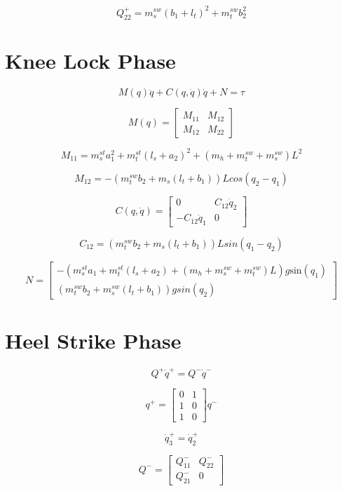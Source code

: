 \[
Q_{22}^{+}=m_{s}^{sw}(b_{1}+l_{t})^{2}+m_{t}^{sw}b_{2}^{2}\]



\section{Knee Lock Phase}


\[
M(q)\ddot{q}+C(q,\dot{q})\dot{q}+N=\tau\]


\[M(q)=\left[\begin{array}{cc}
M_{11} & M_{12}\\
M_{12} & M_{22}\end{array}\right]
\]

\[
M_{11}=m_{s}^{st}a_{1}^{2}+m_{t}^{st}(l_{s}+a_{2})^{2}+(m_{h}+m_{t}^{sw}+m_{s}^{sw})L^{2}\]


\[
M_{12}=-(m_{t}^{sw}b_{2}+m_{s}(l_{t}+b_{1}))Lcos(q_{2}-q_{1})\]


\[
C(q,\dot{q})=\left[\begin{array}{cc}
0 & C_{12}\dot{q}_{2}\\
-C_{12}\dot{q}_{1} & 0\end{array}\right]
\]

\[
C_{12}=(m_{t}^{sw}b_{2}+m_{s}(l_{t}+b_{1}))Lsin(q_{1}-q_{2})
\]

\[
N=\left[\begin{array}{c}
-(m_{s}^{st}a_{1}+m_{t}^{st}(l_{s}+a_{2})+(m_{h}+m_{s}^{sw}+m_{t}^{sw})L)g\mathbf{\mathrm{sin}}(q_{1})\\
(m_{t}^{sw}b_{2}+m_{s}^{sw}(l_{t}+b_{1}))gsin(q_{2})\end{array}\right]
\]

\section{Heel Strike Phase}

\[
Q^{+}\dot{q}^{+}=Q^{-}\dot{q}^{-}\]



\[
q^{+}=\left[\begin{array}{cc}
0 & 1\\
1 & 0\\
1 & 0\end{array}\right]q^{-}\]




\[
\dot{q}_{3}^{+}=\dot{q}_{2}^{+}\]


\[
Q^{-}=\left[\begin{array}{cc}
Q_{11}^{-} & Q_{22}^{-}\\
Q_{21}^{-} & 0\end{array}\right]\]


